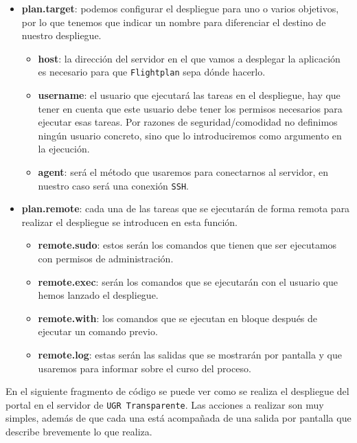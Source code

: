 \begin{itemize}
	\item \textbf{plan.target}: podemos configurar el despliegue para uno o varios objetivos, por lo que tenemos que indicar un nombre para diferenciar el destino de nuestro despliegue.
	\begin{itemize}
		\item \textbf{host}: la dirección del servidor en el que vamos a desplegar la aplicación es necesario para que {\tt Flightplan} sepa dónde hacerlo.
		\newpage
		\item \textbf{username}: el usuario que ejecutará las tareas en el despliegue, hay que tener en cuenta que este usuario debe tener los permisos necesarios para ejecutar esas tareas. Por razones de seguridad/comodidad no definimos ningún usuario concreto, sino que lo introduciremos como argumento en la ejecución.
		\item \textbf{agent}: será el método que usaremos para conectarnos al servidor, en nuestro caso será una conexión {\tt SSH}.
	\end{itemize}
	\item \textbf{plan.remote}: cada una de las tareas que se ejecutarán de forma remota para realizar el despliegue se introducen en esta función.
	\begin{itemize}
		\item \textbf{remote.sudo}: estos serán los comandos que tienen que ser ejecutamos con permisos de administración.
		\item \textbf{remote.exec}: serán los comandos que se ejecutarán con el usuario que hemos lanzado el despliegue.
		\item \textbf{remote.with}: los comandos que se ejecutan en bloque después de ejecutar un comando previo.
		\item \textbf{remote.log}: estas serán las salidas que se mostrarán por pantalla y que usaremos para informar sobre el curso del proceso.
	\end{itemize}	
\end{itemize}

En el siguiente fragmento de código se puede ver como se realiza el despliegue del portal en el servidor de {\tt UGR Transparente}. Las acciones a realizar son muy simples, además de que cada una está acompañada de una salida por pantalla que describe brevemente lo que realiza.

